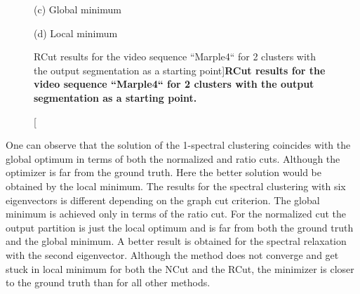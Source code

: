 \begin{figure}[htbp]
\begin{minipage}[t]{0.5\linewidth}
\begin{minipage}[t]{1\textwidth}
\footnotesize (c) Global minimum
\end{minipage}
\begin{minipage}[t]{1\textwidth}
\centering
\hfill \hfill   \hfill 
{} 
\hfill 
{} 
\hfill 
{} 
\hfill 
{} 

\footnotesize (d) Local minimum
\end{minipage}

\end{minipage}
\caption[RCut results for the video sequence ``Marple4`` for 2 clusters with the output segmentation as a starting point]{
{\bf RCut results for the video sequence ``Marple4`` for 2 clusters with the output segmentation as a starting point.}}
\label{fig:RCut_2}
\end{figure}

One can observe that the solution of the 1-spectral clustering coincides with the global optimum in terms of both the normalized and ratio cuts. Although the optimizer is far from the ground truth. Here the better solution
would be obtained by the local minimum.
The results for the spectral clustering with six eigenvectors is different depending on the graph cut criterion. The global minimum is achieved only in terms of the ratio cut. For the normalized cut
the output partition is just the local optimum and is far from both the ground truth and the global minimum.
A better result is obtained for the spectral relaxation with the second eigenvector. Although the method does not converge and get stuck in local minimum for both the NCut and the RCut, the minimizer is 
closer to the ground truth than for all other methods.


